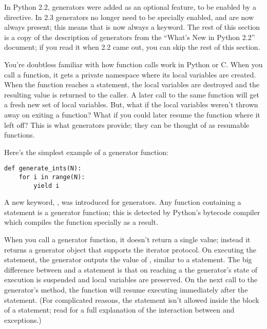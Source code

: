\documentclass{howto}
\begin{document}
In Python 2.2, generators were added as an optional feature, to be
enabled by a  directive.  In
2.3 generators no longer need to be specially enabled, and are now
always present; this means that  is now always a
keyword.  The rest of this section is a copy of the description of
generators from the ``What's New in Python 2.2'' document; if you read
it when 2.2 came out, you can skip the rest of this section.

You're doubtless familiar with how function calls work in Python or C.
When you call a function, it gets a private namespace where its local
variables are created.  When the function reaches a 
statement, the local variables are destroyed and the resulting value
is returned to the caller.  A later call to the same function will get
a fresh new set of local variables. But, what if the local variables
weren't thrown away on exiting a function?  What if you could later
resume the function where it left off?  This is what generators
provide; they can be thought of as resumable functions.

Here's the simplest example of a generator function:

\begin{verbatim}
def generate_ints(N):
    for i in range(N):
        yield i
\end{verbatim}

A new keyword, , was introduced for generators.  Any
function containing a  statement is a generator
function; this is detected by Python's bytecode compiler which
compiles the function specially as a result.

When you call a generator function, it doesn't return a single value;
instead it returns a generator object that supports the iterator
protocol.  On executing the  statement, the generator
outputs the value of , similar to a 
statement.  The big difference between  and a
 statement is that on reaching a  the
generator's state of execution is suspended and local variables are
preserved.  On the next call to the generator's  method,
the function will resume executing immediately after the
 statement.  (For complicated reasons, the
 statement isn't allowed inside the  block
of a  statement; read  for a full
explanation of the interaction between  and
exceptions.)
\end{document}
